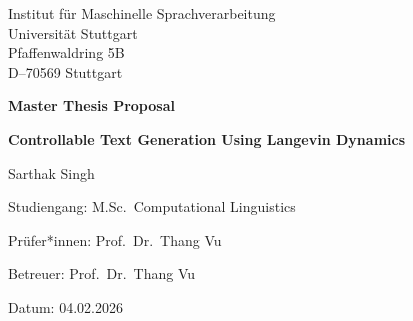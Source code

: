\documentclass[11pt]{article}
\begin{document}
\begin{titlepage}
    \centering

    {\large Institut für Maschinelle Sprachverarbeitung\\}
    {\large Universität Stuttgart\\}
    {\large Pfaffenwaldring 5B\\}
    {\large D--70569 Stuttgart\\}

    \vspace{2.5cm}

    {\Large\bfseries Master Thesis Proposal\par}

    \vspace{2cm}

    {\Huge\bfseries Controllable Text Generation Using Langevin Dynamics\par}
    \vspace{0.1cm}

    \vspace{2.5cm}

    {\Large Sarthak Singh\par}

    \vspace{1.5cm}

    {\large Studiengang: M.Sc.\ Computational Linguistics\par}

    \vspace{1.5cm}

    {\large Prüfer*innen: Prof.\ Dr.\ Thang Vu\par}
    \vspace{0.5cm}
    {\large Betreuer: Prof.\ Dr.\ Thang Vu\par}
    \vspace{0.5cm}
    {\large Datum: 04.02.2026 \par}

    \vfill
\end{titlepage}



\end{document}
